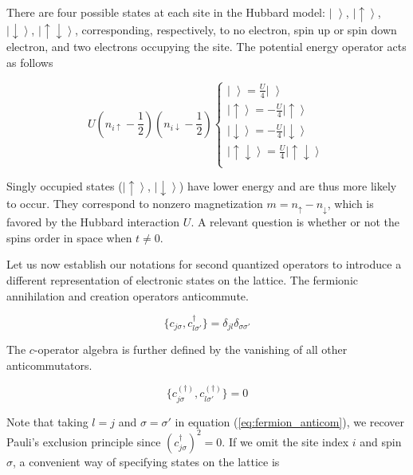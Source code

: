 \documentclass[10pt, twocolumn, twoside]{article}
\begin{document}
There are four possible states at each site in the Hubbard model: $\left| \,\, \right\rangle$, $\left|\uparrow \right\rangle$, $\left|\downarrow\right \rangle$, $\left|\uparrow \downarrow \right\rangle $, corresponding, respectively, to no electron, spin up or spin down electron, and two electrons occupying the site. The potential energy operator acts as follows

\begin{equation}
U (n_{i\uparrow} - \frac{1}{2} ) ( n_{i\downarrow} - \frac{1}{2} ) 
\begin{cases}
\left| \,\, \right\rangle = \frac{U}{4} \left| \,\, \right\rangle \\
\left|\uparrow \right\rangle = -\frac{U}{4} \left|\uparrow \right\rangle \\
\left|\downarrow\right \rangle = -\frac{U}{4} \left|\downarrow\right \rangle \\
\left|\uparrow \downarrow \right\rangle = \frac{U}{4} \left|\uparrow \downarrow \right\rangle \\
\end{cases}
\end{equation}

Singly occupied states ($\left|\uparrow \right\rangle$, $\left|\downarrow\right \rangle$) have lower energy and are thus more likely to occur. They correspond to nonzero magnetization $m = n_{\uparrow} - n_{\downarrow}$, which is favored by the Hubbard interaction $U$. A relevant question is whether or not the spins order in space when $t \neq 0$.

Let us now establish our notations for second quantized operators to introduce a different representation of electronic states on the lattice. The fermionic annihilation and creation operators anticommute.

\begin{equation}
\{ c_{j\sigma} , c_{l \sigma'}^\dagger \} = \delta_{jl} \delta_{\sigma\sigma'}
\end{equation}

The $c$-operator algebra is further defined by the vanishing of all other anticommutators.

\begin{equation}\label{eq:fermion_anticom}
\{ c_{j\sigma}^{(\dagger)} , c_{l \sigma'}^{(\dagger)} \} = 0
\end{equation}

Note that taking $l = j$ and $\sigma = \sigma'$ in equation (\ref{eq:fermion_anticom}), we recover Pauli's exclusion principle since $(c_{j\sigma}^\dagger)^2 = 0$. If we omit the site index $i$ and spin $\sigma$, a convenient way of specifying states on the lattice is
\end{document}
